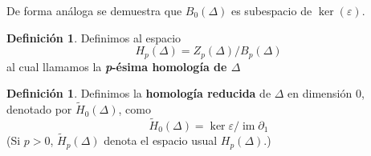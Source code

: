 \documentclass[12pt]{book}
\theoremstyle{definition}
\newtheorem{definition}[theorem]{Definición}
\DeclareMathOperator{\im}{im}
\newcounter{in}
\newcounter{ini}
\begin{document}
De forma análoga se demuestra que $B_{0}(\Delta)$ es subespacio de $\ker(\varepsilon)$.
\begin{definition}
   Definimos al espacio
   $$H_{p}(\Delta)=Z_{p}(\Delta)/B_{p}(\Delta)$$
   al cual llamamos la \textbf{\emph{p}-ésima homología de $\Delta$}
\end{definition}

\begin{definition}
  Definimos la \textbf{homología reducida} de $\Delta$ en
  dimensión $0$, denotado por $\widetilde H_{0}(\Delta)$, como
  \begin{equation*}
    \widetilde H_{0}(\Delta)=\ker\varepsilon/\im \partial_{1}
  \end{equation*}
  (Si $p>0$, $\widetilde H_{p}(\Delta)$ denota el espacio usual
  $H_{p}(\Delta)$.)
\end{definition}
\end{document}
